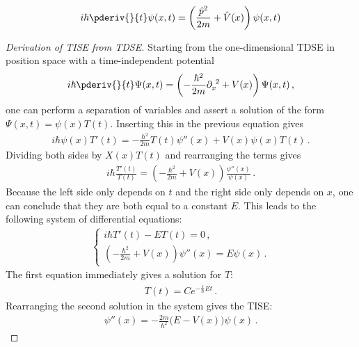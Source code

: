     \begin{example}
        \begin{gather}
            \label{wavematrix:TDSE_position}
            i\hbar\pderiv{}{t}\psi(x,t) = \left(\frac{\hat{p}^2}{2m} + \hat{V}(x)\right)\psi(x,t)
        \end{gather}
        \begin{mdframed}[roundcorner=10pt, linecolor=blue, linewidth=1pt]
            \begin{proof}[Derivation of TISE from TDSE]
                Starting from the one-dimensional TDSE in position space with a time-independent potential
                \begin{gather}
               		i\hbar\pderiv{}{t}\Psi(x,t) = \left(-\frac{\hbar^2}{2m}\partial_x^{\ 2} + V(x)\right)\Psi(x,t)\,,
               	\end{gather}
                one can perform a separation of variables and assert a solution of the form $\Psi(x,t) = \psi(x)T(t)$. Inserting this in the previous equation gives
                \begin{gather}
               		i\hbar\psi(x)T'(t) = -\frac{\hbar^2}{2m}T(t)\psi''(x) + V(x)\psi(x)T(t)\,.
               	\end{gather}
                Dividing both sides by $X(x)T(t)$ and rearranging the terms gives
                \begin{gather}
               		i\hbar\frac{T'(t)}{T(t)} = \left(-\frac{\hbar^2}{2m} + V(x)\right)\frac{\psi''(x)}{\psi(x)}\,.
               	\end{gather}
                Because the left side only depends on $t$ and the right side only depends on $x$, one can conclude that they are both equal to a constant $E$. This leads to the following system of differential equations:
                \begin{gather}
                    \begin{cases}
                        i\hbar T'(t) - ET(t) = 0\,,\\
                        \left(-\frac{\hbar^2}{2m} + V(x)\right)\psi''(x) = E\psi(x)\,.
                    \end{cases}
                \end{gather}
                The first equation immediately gives a solution for $T$:
                \begin{gather}
                    \label{derivations_qm:exponential}
               		T(t) = Ce^{-\frac{i}{\hbar}Et}\,.
               	\end{gather}
                Rearranging the second solution in the system gives the TISE:
                \begin{gather}
                    \label{derivations_qm:TISE}
               		\psi''(x) = -\frac{2m}{\hbar^2}\bigl(E - V(x)\bigr)\psi(x)\,.
               	\end{gather}
            \end{proof}
        \end{mdframed}
    \end{example}

